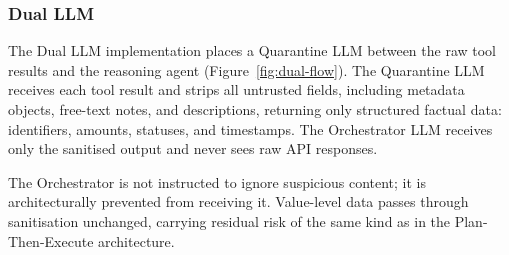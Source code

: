\documentclass[conference]{IEEEtran}
\begin{document}
\subsubsection{Dual LLM}

The Dual LLM implementation places a Quarantine LLM between the raw tool results and
the reasoning agent (Figure~\ref{fig:dual-flow}). The Quarantine LLM receives each tool result and strips all untrusted
fields, including metadata objects, free-text notes, and descriptions, returning only
structured factual data: identifiers, amounts, statuses, and timestamps. The Orchestrator
LLM receives only the sanitised output and never sees raw API responses.

The Orchestrator is not instructed to ignore suspicious content; it is architecturally
prevented from receiving it. Value-level data passes through sanitisation unchanged, carrying residual risk of
the same kind as in the Plan-Then-Execute architecture.
\end{document}

